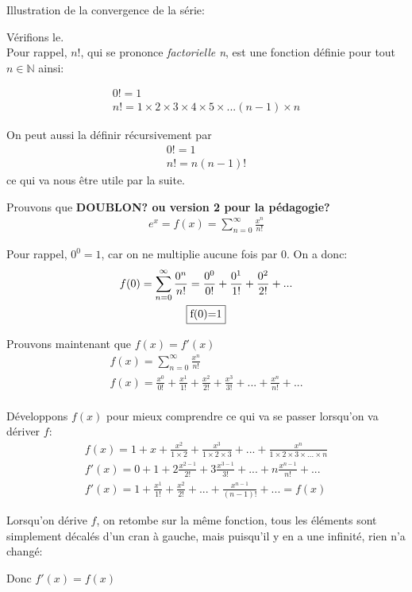 \documentclass[12pt]{article}
\begin{document}
Illustration de la convergence de la série:


Vérifions le. \\
Pour rappel, $n!$, qui se prononce \textit{factorielle n}, est une fonction définie pour tout $n\in \mathbb{N}$ ainsi:

\begin{gather*}
    0!=1 \\
    n!=1\times2\times3\times4\times5\times...(n-1)\times n
\end{gather*}

On peut aussi la définir récursivement par 
\begin{gather*}
    0!=1 \\
    n!=n(n-1)!
\end{gather*}
ce qui va nous être utile par la suite.

Prouvons que \textbf{DOUBLON? ou version 2 pour la pédagogie?}
\begin{gather*}
    e^x=f(x)=\sum_{n=0}^\infty{\frac{x^n}{n!}}
\end{gather*}

Pour rappel, $0^0 = 1$, car on ne multiplie aucune fois par $0$. On a donc:
\begin{gather*}
    f(0)=\sum_{n=0}^\infty{\frac{0^n}{n!}}=\frac{0^0}{0!}+\frac{0^1}{1!}+\frac{0^2}{2!}+... \\
    \boxed{$f(0)=1$}
\end{gather*}


Prouvons maintenant que $f(x)=f'(x)$
\begin{gather*}
    f(x)=\sum_{n=0}^\infty{\frac{x^n}{n!}} \\
    f(x)=\frac{x^0}{0!}+\frac{x^1}{1!}+\frac{x^2}{2!}+\frac{x^3}{3!}+...+\frac{x^n}{n!}+... \\
\end{gather*}

Développons $f(x)$ pour mieux comprendre ce qui va se passer lorsqu'on va dériver $f$:
\begin{gather*}
    f(x)=1+x+\frac{x^2}{1 \times2}+\frac{x^3}{1 \times2 \times3}+...+\frac{x^n}{1 \times2  \times3  \times ... \times n} \\
    f'(x)=0+1+2\frac{x^{2-1}}{2!}+3\frac{x^{3-1}}{3!}+...+n\frac{x^{n-1}}{n!}+... \\
    f'(x)=1+\frac{x^{1}}{1!}+\frac{x^{2}}{2!}+...+\frac{x^{n-1}}{(n-1)!}+...=f(x)
\end{gather*}

Lorsqu'on dérive $f$, on retombe sur la même fonction, tous les éléments sont simplement décalés d'un cran à gauche, mais puisqu'il y en a une infinité, rien n'a changé:

Donc $\boxed{f'(x)=f(x)}$
\end{document}
